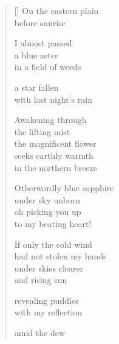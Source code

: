 \documentclass[12pt,a4paper]{article}
\begin{document}
\thispagestyle{empty}

\poemtitle{}

\settowidth{\versewidth}{where I seek my reflection}

\bigskip

\begin{verse}[\versewidth]
  On the eastern plain \\
  before sunrise

  I almost passed \\
  a blue aster \\
  in a field of weeds

  a star fallen \\
  with last night's rain

  Awakening through \\
  the lifting mist \\
  the magnificent flower \\
  seeks earthly warmth \\
  in the northern breeze

  Otherwordly blue sapphire \\
  under sky unborn \\
  oh picking you up \\
  to my beating heart!

  If only the cold wind \\
  had not stolen my hands \\
  under skies clearer \\
  and rising sun

  revealing puddles \\
  with my reflection

  amid the dew
\end{verse}
\end{document}
